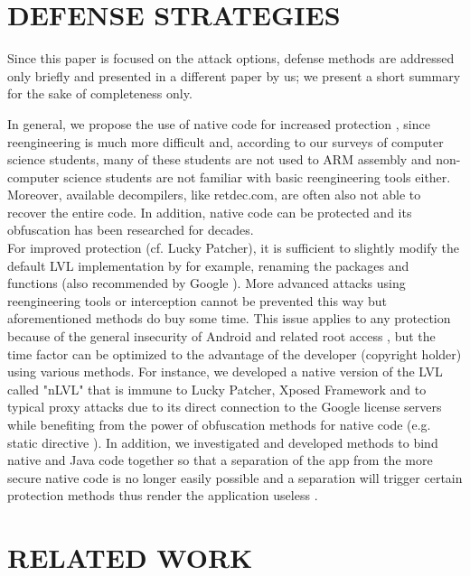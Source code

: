 \documentclass{sig-alternate}
\begin{document}
\section{DEFENSE STRATEGIES}
\label{defense}

Since this paper is focused on the attack options, defense methods are addressed only briefly and presented in a different paper by us; we present a short summary for the sake of completeness only. 

In general, we propose the use of native code for increased protection \cite{nils}, since reengineering is much more difficult and, according to our surveys of computer science students, many of these students are not used to ARM assembly and non-computer science students are not familiar with basic reengineering tools either. Moreover, available decompilers, like retdec.com, are often also not able to recover the entire code. In addition, native code can be protected and its obfuscation has been researched for decades. \\

For improved protection (cf. Lucky Patcher), it is sufficient to slightly modify the default LVL implementation by for example, renaming the packages and functions (also recommended by Google \cite{lvlOverview}). More advanced attacks using reengineering tools or interception cannot be prevented this way but aforementioned methods do buy some time. This issue applies to any protection because of the general insecurity of Android and related root access \cite{nils}, but the time factor can be optimized to the advantage of the developer (copyright holder) using various methods. For instance, we developed a native version of the LVL called "nLVL" \cite{chen} that is immune to Lucky Patcher, Xposed Framework and to typical proxy attacks due to its direct connection to the Google license servers while benefiting from the power of obfuscation methods for native code (e.g. static directive \cite{chen}). In addition, we investigated and developed methods to bind native and Java code together so that a separation of the app from the more secure native code is no longer easily possible and a separation will trigger certain protection methods thus render the application useless \cite{nils}.


\section{RELATED WORK}
\end{document}
